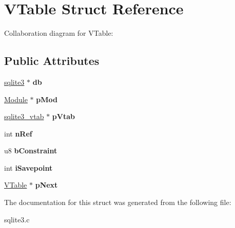 \hypertarget{structVTable}{}\section{V\+Table Struct Reference}
\label{structVTable}


Collaboration diagram for V\+Table\+:
\subsection*{Public Attributes}
\begin{DoxyCompactItemize}
\item 
\hyperlink{structsqlite3}{sqlite3} $\ast$ {\bfseries db}\hypertarget{structVTable_a855b43c118d693910e9060cc9d9ac91a}{}\label{structVTable_a855b43c118d693910e9060cc9d9ac91a}

\item 
\hyperlink{structModule}{Module} $\ast$ {\bfseries p\+Mod}\hypertarget{structVTable_ae444452a7168e2f4224a75768abe8312}{}\label{structVTable_ae444452a7168e2f4224a75768abe8312}

\item 
\hyperlink{structsqlite3__vtab}{sqlite3\+\_\+vtab} $\ast$ {\bfseries p\+Vtab}\hypertarget{structVTable_ae15b9cb002c013019dcbac919bda9ac8}{}\label{structVTable_ae15b9cb002c013019dcbac919bda9ac8}

\item 
int {\bfseries n\+Ref}\hypertarget{structVTable_a12ffe156e5e8e7d19ed029ccfe4ab5dc}{}\label{structVTable_a12ffe156e5e8e7d19ed029ccfe4ab5dc}

\item 
u8 {\bfseries b\+Constraint}\hypertarget{structVTable_a5a970416a76dbe3be500c9458c89550d}{}\label{structVTable_a5a970416a76dbe3be500c9458c89550d}

\item 
int {\bfseries i\+Savepoint}\hypertarget{structVTable_a19f1c6c5f5fedabba7e605bbe15358e4}{}\label{structVTable_a19f1c6c5f5fedabba7e605bbe15358e4}

\item 
\hyperlink{structVTable}{V\+Table} $\ast$ {\bfseries p\+Next}\hypertarget{structVTable_af3cac5e5a38508d0111acb9aa6c5f435}{}\label{structVTable_af3cac5e5a38508d0111acb9aa6c5f435}

\end{DoxyCompactItemize}


The documentation for this struct was generated from the following file\+:\begin{DoxyCompactItemize}
\item 
sqlite3.\+c\end{DoxyCompactItemize}
